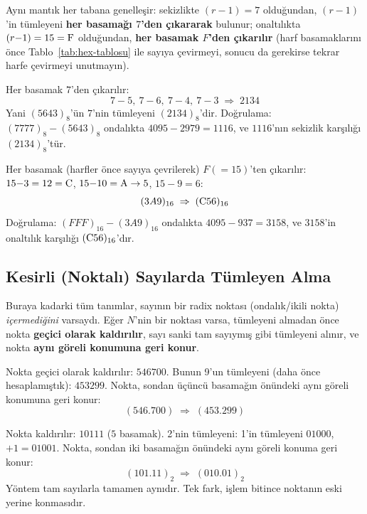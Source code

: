 Aynı mantık her tabana genelleşir: sekizlikte $(r{-}1)=7$ olduğundan, $(r{-}1)$'in tümleyeni
\textbf{her basamağı $7$'den çıkararak} bulunur; onaltılıkta $(r{-}1)=15={\rm F}$ olduğundan,
\textbf{her basamak $F$'den çıkarılır} (harf basamaklarını önce Tablo~\ref{tab:hex-tablosu}
ile sayıya çevirmeyi, sonucu da gerekirse tekrar harfe çevirmeyi unutmayın).

\begin{ornek}
Her basamak $7$'den çıkarılır:
\[
7{-}5,\ 7{-}6,\ 7{-}4,\ 7{-}3 \;\Rightarrow\; 2134
\]
Yani $(5643)_8$'ün $7$'nin tümleyeni $(2134)_8$'dir. Doğrulama: $(7777)_8-(5643)_8$ ondalıkta
$4095-2979=1116$, ve $1116$'nın sekizlik karşılığı $(2134)_8$'tür. \checkmark
\end{ornek}

\begin{ornek}
Her basamak (harfler önce sayıya çevrilerek) $F(=15)$'ten çıkarılır: $15{-}3=12={\rm C}$,
$15{-}10={\rm A}\to5$, $15{-}9=6$:
\[
(3A9)_{16} \;\Rightarrow\; ({\rm C}56)_{16}
\]
Doğrulama: $(FFF)_{16}-(3A9)_{16}$ ondalıkta $4095-937=3158$, ve $3158$'in onaltılık karşılığı
$({\rm C}56)_{16}$'dır. \checkmark
\end{ornek}

\subsection{Kesirli (Noktalı) Sayılarda Tümleyen Alma}
\label{sec:tumleyen-noktali}

Buraya kadarki tüm tanımlar, sayının bir radix noktası (ondalık/ikili nokta) \emph{içermediğini}
varsaydı. Eğer $N$'nin bir noktası varsa, tümleyeni almadan önce nokta \textbf{geçici olarak
kaldırılır}, sayı sanki tam sayıymış gibi tümleyeni alınır, ve nokta \textbf{aynı göreli
konumuna geri konur}.

\begin{ornek}[$(546.700)$'ün 9'un Tümleyeni]
Nokta geçici olarak kaldırılır: $546700$. Bunun 9'un tümleyeni (daha önce hesaplamıştık):
$453299$. Nokta, sondan üçüncü basamağın önündeki aynı göreli konumuna geri konur:
\[
(546.700) \;\Rightarrow\; (453.299)
\]
\end{ornek}

\begin{ornek}
Nokta kaldırılır: $10111$ ($5$ basamak). 2'nin tümleyeni: 1'in tümleyeni $01000$, $+1=01001$.
Nokta, sondan iki basamağın önündeki aynı göreli konuma geri konur:
\[
(101.11)_2 \;\Rightarrow\; (010.01)_2
\]
Yöntem tam sayılarla tamamen aynıdır. Tek fark, işlem bitince noktanın eski yerine
konmasıdır.
\end{ornek}

